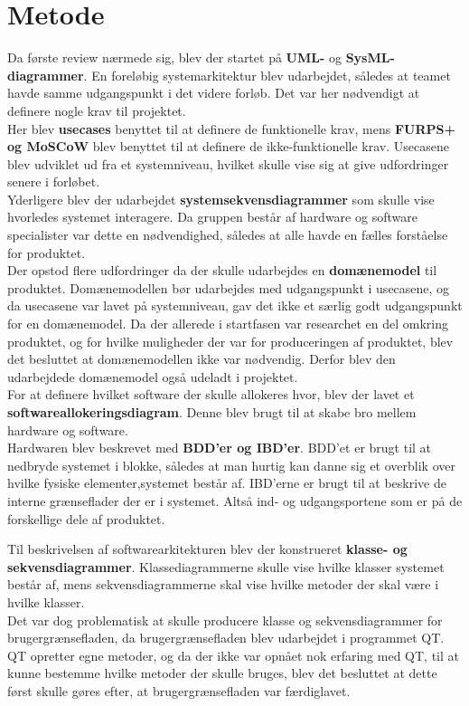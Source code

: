 \section{Metode}

Da første review nærmede sig, blev der startet på \textbf{UML-} og \textbf{SysML-diagrammer}. En foreløbig systemarkitektur blev udarbejdet, således at teamet havde samme udgangspunkt i det videre forløb. Det var her nødvendigt at definere nogle krav til projektet.\\

Her blev \textbf{usecases} benyttet til at definere de funktionelle krav, mens \textbf{FURPS+ og MoSCoW} blev benyttet til at definere de ikke-funktionelle krav. Usecasene blev udviklet ud fra et systemniveau, hvilket skulle vise sig at give udfordringer senere i forløbet.\\

Yderligere blev der udarbejdet \textbf{systemsekvensdiagrammer} som skulle vise hvorledes systemet interagere. Da gruppen består af hardware og software specialister var dette en nødvendighed, således at alle havde en fælles forståelse for produktet.\\

Der opstod flere udfordringer da der skulle udarbejdes en \textbf{domænemodel} til produktet. Domænemodellen bør udarbejdes med udgangspunkt i usecasene, og da usecasene var lavet på systemniveau, gav det ikke et særlig godt udgangspunkt for en domænemodel. Da der allerede i startfasen var researchet en del omkring produktet, og for hvilke muligheder der var for produceringen af produktet, blev det besluttet at domænemodellen ikke var nødvendig. Derfor blev den udarbejdede domænemodel også udeladt i projektet.\\
 
For at definere hvilket software der skulle allokeres hvor, blev der lavet et \textbf{softwareallokeringsdiagram}. Denne blev brugt til at skabe bro mellem hardware og software.\\

Hardwaren blev beskrevet med \textbf{BDD’er og IBD’er}. BDD’et er brugt til at nedbryde systemet i blokke, således at man hurtig kan danne sig et overblik over hvilke fysiske elementer,systemet består af. 
IBD’erne er brugt til at beskrive de interne grænseflader der er i systemet. Altså ind- og udgangsportene som er på de forskellige dele af produktet.

Til beskrivelsen af softwarearkitekturen blev der konstrueret \textbf{klasse- og sekvensdiagrammer}. Klassediagrammerne skulle vise hvilke klasser systemet består af, mens sekvensdiagrammerne skal vise hvilke metoder der skal være i hvilke klasser. \\

Det var dog problematisk at skulle producere klasse og sekvensdiagrammer for brugergrænsefladen, da brugergrænsefladen blev udarbejdet i programmet QT. QT opretter egne metoder, og da der ikke var opnået nok erfaring med QT, til at kunne bestemme hvilke metoder der skulle bruges, blev det besluttet at dette først skulle gøres efter, at brugergrænsefladen var færdiglavet.
